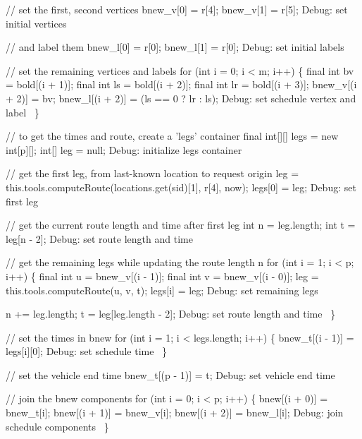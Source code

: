   // set the first, second vertices
  bnew_v[0] = r[4];
  bnew_v[1] = r[5];
  \LA{}Debug: set initial vertices~{\nwtagstyle{}}\RA{}

  // and label them
  bnew_l[0] = r[0];
  bnew_l[1] = r[0];
  \LA{}Debug: set initial labels~{\nwtagstyle{}}\RA{}

  // set the remaining vertices and labels
  for (int i = 0; i < m; i++) \{
    final int bv = bold[(i + 1)];
    final int ls = bold[(i + 2)];
    final int lr = bold[(i + 3)];
    bnew_v[(i + 2)] = bv;
    bnew_l[(i + 2)] = (ls == 0 ? lr : ls);
    \LA{}Debug: set schedule vertex and label~{\nwtagstyle{}}\RA{}
  \}

  // to get the times and route, create a 'legs' container
  final int[][] legs = new int[p][];
  int[] leg = null;
  \LA{}Debug: initialize legs container~{\nwtagstyle{}}\RA{}

  // get the first leg, from last-known location to request origin
  leg = this.tools.computeRoute(locations.get(sid)[1], r[4], now);
  legs[0] = leg;
  \LA{}Debug: set first leg~{\nwtagstyle{}}\RA{}

  // get the current route length and time after first leg
  int n = leg.length;
  int t = leg[n - 2];
  \LA{}Debug: set route length and time~{\nwtagstyle{}}\RA{}

  // get the remaining legs while updating the route length n
  for (int i = 1; i < p; i++) \{
    final int u = bnew_v[(i - 1)];
    final int v = bnew_v[(i - 0)];
    leg = this.tools.computeRoute(u, v, t);
    legs[i] = leg;
    \LA{}Debug: set remaining legs~{\nwtagstyle{}}\RA{}

    n += leg.length;
    t = leg[leg.length - 2];
    \LA{}Debug: set route length and time~{\nwtagstyle{}}\RA{}
  \}

  // set the times in bnew
  for (int i = 1; i < legs.length; i++) \{
    bnew_t[(i - 1)] = legs[i][0];
    \LA{}Debug: set schedule time~{\nwtagstyle{}}\RA{}
  \}

  // set the vehicle end time
  bnew_t[(p - 1)] = t;
  \LA{}Debug: set vehicle end time~{\nwtagstyle{}}\RA{}

  // join the bnew components
  for (int i = 0; i < p; i++) \{
    bnew[(i + 0)] = bnew_t[i];
    bnew[(i + 1)] = bnew_v[i];
    bnew[(i + 2)] = bnew_l[i];
    \LA{}Debug: join schedule components~{\nwtagstyle{}}\RA{}
  \}

